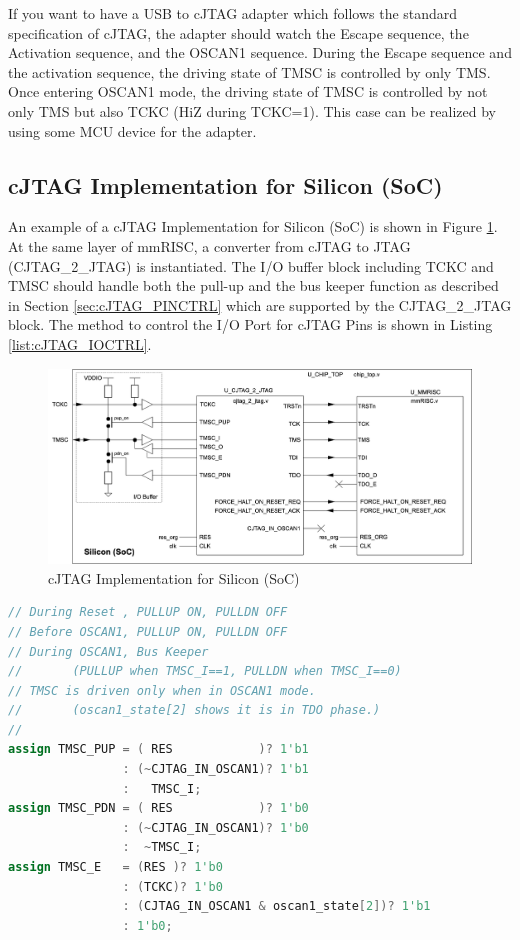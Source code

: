 If you want to have a USB to cJTAG adapter which follows the standard specification of cJTAG, the adapter should watch the Escape sequence, the Activation sequence, and the OSCAN1 sequence. During the Escape sequence and the activation sequence, the driving state of TMSC is controlled by only TMS. Once entering OSCAN1 mode, the driving state of TMSC is controlled by not only TMS but also TCKC (HiZ during TCKC=1). This case can be realized by using some MCU device for the adapter. 

\subsection{cJTAG Implementation for Silicon (SoC)}

An example of a cJTAG Implementation for Silicon (SoC) is shown in Figure \ref{fig:cJTAG_SoC}. At the same layer of mmRISC, a converter from cJTAG to JTAG (CJTAG\_2\_JTAG) is instantiated. The I/O buffer block including TCKC and TMSC should handle both the pull-up and the bus keeper function as described in Section \ref{sec:cJTAG_PINCTRL} which are supported by the CJTAG\_2\_JTAG block. The method to control the I/O Port for cJTAG Pins is shown in Listing \ref{list:cJTAG_IOCTRL}.

\begin{figure}[H]
    \includegraphics[width=1.00\columnwidth]{./Figure/cJTAG_SoC.png}
    \caption{cJTAG Implementation for Silicon (SoC)}
    \label{fig:cJTAG_SoC}
\end{figure}

\begin{lstlisting}[caption=I/O Port Control for cJTAG Pins, label=list:cJTAG_IOCTRL, captionpos=b, language=Verilog, basicstyle=\ttfamily\scriptsize, frame=single]
// During Reset , PULLUP ON, PULLDN OFF
// Before OSCAN1, PULLUP ON, PULLDN OFF
// During OSCAN1, Bus Keeper
//       (PULLUP when TMSC_I==1, PULLDN when TMSC_I==0)
// TMSC is driven only when in OSCAN1 mode.
//       (oscan1_state[2] shows it is in TDO phase.)
//
assign TMSC_PUP = ( RES            )? 1'b1
                : (~CJTAG_IN_OSCAN1)? 1'b1
                :   TMSC_I;
assign TMSC_PDN = ( RES            )? 1'b0
                : (~CJTAG_IN_OSCAN1)? 1'b0
                :  ~TMSC_I;
assign TMSC_E   = (RES )? 1'b0
                : (TCKC)? 1'b0
                : (CJTAG_IN_OSCAN1 & oscan1_state[2])? 1'b1
                : 1'b0;
\end{lstlisting}

